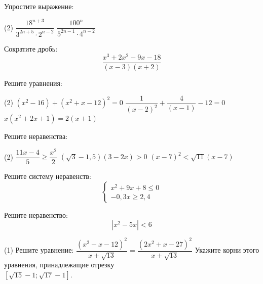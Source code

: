 %
%

\begin{class}[number=1]
	\begin{listofex}
		\item Упростите выражение:
		\begin{tasks}(2)
			\task \( \dfrac{18^{n+3}}{3^{2n+5}\cdot2^{n-2}} \)
			\task \( \dfrac{100^n}{5^{2n-1}\cdot4^{n-2}} \)
		\end{tasks}
		\item Сократите дробь:
			\[\dfrac{x^3+2x^2-9x-18}{(x-3)(x+2)}\]
		\item Решите уравнения:
		\begin{tasks}(2)
			\task \( (x^2-16)+(x^2+x-12)^2=0 \)
			\task \( \dfrac{1}{(x-2)^2} +\dfrac{4}{(x-1)}-12=0\)
			\task \( x(x^2+2x+1)=2(x+1) \)
		\end{tasks}
		\item Решите неравенства:
		\begin{tasks}(2)
			\task \( \dfrac{11x-4}{5}\ge\dfrac{x^2}{2} \)
			\task \( (\sqrt{3}-1,5)(3-2x)>0 \)
			\task \( (x-7)^2<\sqrt{11}(x-7) \)
		\end{tasks}
		\item Решите систему неравенств:
		\[ \begin{cases} x^2+9x+8\le0 \\ -0,3x\ge2,4 \end{cases}\]
		\item Решите неравенство:
		\[|x^2-5x|<6\]
		\item 
		\begin{tasks}(1)
			\task Решите уравнение: \( 	\dfrac{(x^2-x-12)^2}{x+\sqrt{13}}=\dfrac{(2x^2+x-27)^2}{x+\sqrt{13}} \)
			\task Укажите корни этого уравнения, принадлежащие отрезку \\ \( [\sqrt{15}-1; \sqrt{17}-1] \).
		\end{tasks}
	\end{listofex}
\end{class}

